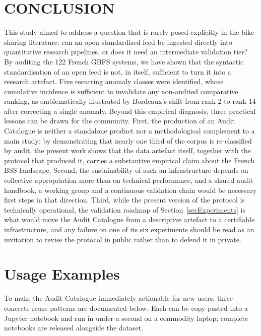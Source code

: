\documentclass[a4paper,twoside]{article}
\begin{document}
\section{\uppercase{Conclusion}}
\label{secConclusion}

This study aimed to address a question that is rarely posed
explicitly in the bike-sharing literature: can an open
standardised feed be ingested directly into quantitative research
pipelines, or does it need an intermediate validation tier? By
auditing the 122 French GBFS systems, we have shown that the
syntactic standardisation of an open feed is not, in itself,
sufficient to turn it into a research artefact. Five recurring
anomaly classes were identified, whose cumulative incidence is
sufficient to invalidate any non-audited comparative ranking, as
emblematically illustrated by Bordeaux's shift from rank 2 to
rank 14 after correcting a single anomaly. Beyond this empirical
diagnosis, three practical lessons can be drawn for the
community. First, the production of an Audit Catalogue is neither a
standalone product nor a methodological complement to a main
study: by demonstrating that nearly one third of the corpus is
re-classified by audit, the present work shows that the data
artefact itself, together with the protocol that produced it,
carries a substantive empirical claim about the French BSS
landscape. Second, the
sustainability of such an infrastructure depends on collective
appropriation more than on technical performance, and a shared
audit handbook, a working group and a continuous validation chain
would be necessary first steps in that direction. Third, while
the present version of the protocol is technically operational,
the validation roadmap of Section~\ref{secExperiments} is what
would move the Audit Catalogue from a descriptive artefact to a
certifiable infrastructure, and any failure on one of its six
experiments should be read as an invitation to revise the
protocol in public rather than to defend it in private.

\section*{Usage Examples}
\label{secUsage}

To make the Audit Catalogue immediately actionable for new users,
three concrete reuse patterns are documented below. Each can be
copy-pasted into a Jupyter notebook and run in under a second on
a commodity laptop; complete notebooks are released alongside
the dataset.
\end{document}
